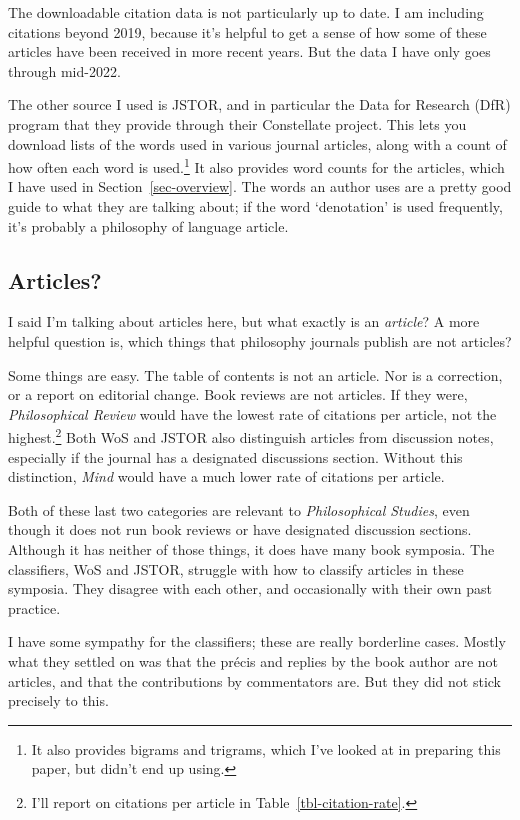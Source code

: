 \documentclass[
  11pt,
  letterpaper,
  DIV=11,
  numbers=noendperiod,
  twoside]{scrartcl}
\begin{document}
The downloadable citation data is not particularly up to date. I am
including citations beyond 2019, because it's helpful to get a sense of
how some of these articles have been received in more recent years. But
the data I have only goes through mid-2022.

The other source I used is JSTOR, and in particular the Data for
Research (DfR) program that they provide through their Constellate
project. This lets you download lists of the words used in various
journal articles, along with a count of how often each word is
used.\footnote{It also provides bigrams and trigrams, which I've looked
  at in preparing this paper, but didn't end up using.} It also provides
word counts for the articles, which I have used in
Section~\ref{sec-overview}. The words an author uses are a pretty good
guide to what they are talking about; if the word `denotation' is used
frequently, it's probably a philosophy of language article.

\subsection{Articles?}\label{sec-what-is-an-article}

I said I'm talking about articles here, but what exactly is an
\emph{article}? A more helpful question is, which things that philosophy
journals publish are not articles?

Some things are easy. The table of contents is not an article. Nor is a
correction, or a report on editorial change. Book reviews are not
articles. If they were, \emph{Philosophical Review} would have the
lowest rate of citations per article, not the highest.\footnote{I'll
  report on citations per article in Table~\ref{tbl-citation-rate}.}
Both WoS and JSTOR also distinguish articles from discussion notes,
especially if the journal has a designated discussions section. Without
this distinction, \emph{Mind} would have a much lower rate of citations
per article.

Both of these last two categories are relevant to \emph{Philosophical
Studies}, even though it does not run book reviews or have designated
discussion sections. Although it has neither of those things, it does
have many book symposia. The classifiers, WoS and JSTOR, struggle with
how to classify articles in these symposia. They disagree with each
other, and occasionally with their own past practice.

I have some sympathy for the classifiers; these are really borderline
cases. Mostly what they settled on was that the précis and replies by
the book author are not articles, and that the contributions by
commentators are. But they did not stick precisely to this.
\end{document}
